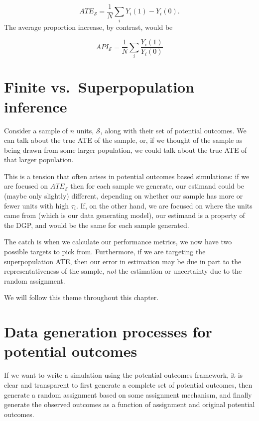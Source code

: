 \documentclass[
]{book}
\begin{document}
\[ ATE_{\mathcal{S}} = \frac{1}{N} \sum_{i} Y_i(1) - Y_i( 0 ) . \]
The average proportion increase, by contrast, would be

\[ API_{\mathcal{S}} = \frac{1}{N} \sum_{i} \frac{Y_i(1)}{Y_i(0)} \]

\section{Finite vs.~Superpopulation inference}\label{finite-vs.-superpopulation-inference}

Consider a sample of \(n\) units, \(\mathcal{S}\), along with their set of potential outcomes.
We can talk about the true ATE of the sample, or, if we thought of the sample as being drawn from some larger population, we could talk about the true ATE of that larger population.

This is a tension that often arises in potential outcomes based simulations: if we are focused on \(ATE_{\mathcal{S}}\) then for each sample we generate, our estimand could be (maybe only slightly) different, depending on whether our sample has more or fewer units with high \(\tau_i\).
If, on the other hand, we are focused on where the units came from (which is our data generating model), our estimand is a property of the DGP, and would be the same for each sample generated.

The catch is when we calculate our performance metrics, we now have two possible targets to pick from.
Furthermore, if we are targeting the superpopulation ATE, then our error in estimation may be due in part to the representativeness of the sample, \emph{not} the estimation or uncertainty due to the random assignment.

We will follow this theme throughout this chapter.

\section{Data generation processes for potential outcomes}\label{data-generation-processes-for-potential-outcomes}

If we want to write a simulation using the potential outcomes framework, it is clear and transparent to first generate a complete set of potential outcomes, then generate a random assignment based on some assignment mechanism, and finally generate the observed outcomes as a function of assignment and original potential outcomes.
\end{document}
